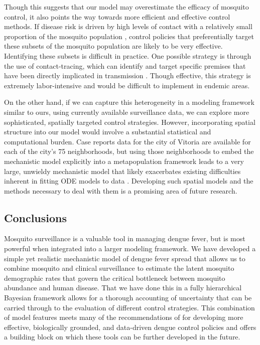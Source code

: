 \documentclass[10pt,letterpaper]{article}
\begin{document}
Though this suggests that our model may overestimate the efficacy of mosquito control, it also points the way towards more efficient and effective control methods.
If disease risk is driven by high levels of contact with a relatively small proportion of the mosquito population \cite{Canyon1999, Yoon2012}, control policies that preferentially target these subsets of the mosquito population are likely to be very effective.
Identifying these subsets is difficult in practice.
One possible strategy is through the use of contact-tracing, which can identify and target specific premises that have been directly implicated in transmission \cite{Vazquez-Prokopec2017}.
Though effective, this strategy is extremely labor-intensive and would be difficult to implement in endemic areas.

On the other hand, if we can capture this heterogeneity in a modeling framework similar to ours, using currently available surveillance data, we can explore more sophisticated, spatially targeted control strategies.
However, incorporating spatial structure into our model would involve a substantial statistical and computational burden.
Case reports data for the city of Vitoria are available for each of the city's 75 neighborhoods, but using those neighborhoods to embed the mechanistic model explicitly into a metapopulation framework leads to a very large, unwieldy mechanistic model that likely exacerbates existing difficulties inherent in fitting ODE models to data \cite{Girolami2008, Calderhead2011}.
Developing such spatial models and the methods necessary to deal with them is a promising area of future research.

\subsection*{Conclusions}

Mosquito surveillance is a valuable tool in managing dengue fever, but is most powerful when integrated into a larger modeling framework.
We have developed a simple yet realistic mechanistic model of dengue fever spread that allows us to combine mosquito and clinical surveillance to estimate the latent mosquito demographic rates that govern the critical bottleneck between mosquito abundance and human disease.
That we have done this in a fully hierarchical Bayesian framework allows for a thorough accounting of uncertainty that can be carried through to the evaluation of different control strategies.
This combination of model features meets many of the recommendations of \cite{Morrison2008, Achee2015} for developing more effective, biologically grounded, and data-driven dengue control policies and offers a building block on which these tools can be further developed in the future.
\end{document}
